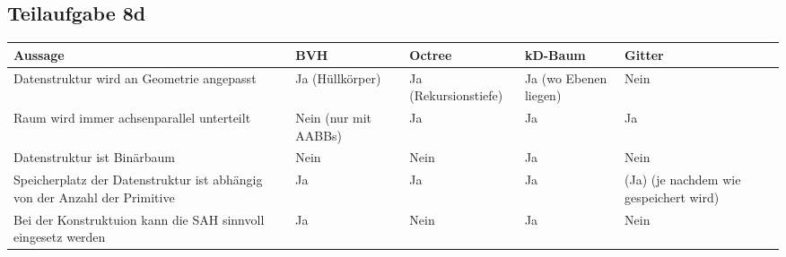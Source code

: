 \documentclass[a4paper]{scrartcl}
\begin{document}
\subsection*{Teilaufgabe 8d}
\begin{tabular}{p{4cm}p{2.2cm}p{2.2cm}p{2.2cm}p{2.2cm}}\toprule
Aussage                                                                 & BVH             & Octree               & kD-Baum               & Gitter               \\\midrule
Datenstruktur wird an Geometrie angepasst                               & Ja (Hüllkörper) & Ja (Rekursionstiefe) & Ja (wo Ebenen liegen) & Nein \\
Raum wird immer achsen\-parallel unterteilt                             & Nein (nur mit AABBs)            & Ja                   & Ja                    & Ja                   \\
Datenstruktur ist Binär\-baum\footnotemark                              & Nein            & Nein                 & Ja                    & Nein                 \\
Speicherplatz der Daten\-struktur ist abhängig von der Anzahl der Primitive & Ja            & Ja                   & Ja                    & (Ja) (je nachdem wie gespeichert wird)                  \\
Bei der Konstruktuion kann die SAH sinnvoll eingesetz werden            & Ja\footnotemark & Nein                 & Ja                    & Nein                 \\\bottomrule
\end{tabular}
\end{document}
